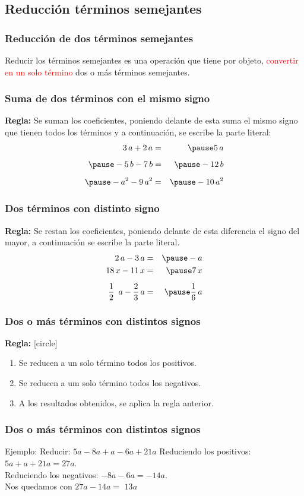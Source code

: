 \subsection*{Reducción términos semejantes}
\begin{frame}
\frametitle{Reducción de dos términos semejantes}
Reducir los términos semejantes es una operación que tiene por objeto, \textcolor{red}{convertir en un solo término} dos o más términos semejantes.
\end{frame}
\begin{frame}
\frametitle{Suma de dos términos con el mismo signo}
\textbf{Regla: } Se suman los coeficientes, poniendo delante de esta suma el mismo signo que tienen todos los términos y a continuación, se escribe la parte literal:
\pause
\begin{eqnarray*}
3 \, a + 2 \, a &=& \pause 5 \, a \\[0.5em] \pause
-5 \, b -7 \, b &=& \pause - 12 \, b \\[0.5em] \pause
-a^{2} - 9 \, a^{2} &=& \pause - 10 \, a^{2}
\end{eqnarray*}
\end{frame}
\begin{frame}
\frametitle{Dos términos con distinto signo}
\textbf{Regla: } Se restan los coeficientes, poniendo delante de esta diferencia el signo del mayor, a continuación se escribe la parte literal.
\pause
\begin{eqnarray*}
2 \, a - 3 \, a &=& \pause - a \\
18 \, x - 11 \, x &=& \pause 7 \, x \\[0.5em]
\dfrac{1}{2}  \, a - \dfrac{2}{3} \, a &=& \pause \dfrac{1}{6} \, a
\end{eqnarray*}
\end{frame}
\begin{frame}
\frametitle{Dos o más términos con distintos signos}
\textbf{Regla: }
[circle]
\begin{enumerate}[<+->]
\item Se reducen a un solo término todos los positivos.
\item Se reducen a um solo término todos los negativos.
\item A los resultados obtenidos, se aplica la regla anterior.
\end{enumerate}
\end{frame}
\begin{frame}
\frametitle{Dos o más términos con distintos signos}
Ejemplo: Reducir: $5 a - 8 a + a - 6 a + 21 a$
\pause
Reduciendo los positivos: $5 a + a + 21 a =  27 a$.
\\
\bigskip
\pause
Reduciendo los negativos: $-8 a - 6 a =  -14 a$.
\\
\bigskip
\pause
Nos quedamos con $27 a - 14 a =$ \pause $13 a$
\end{frame}
